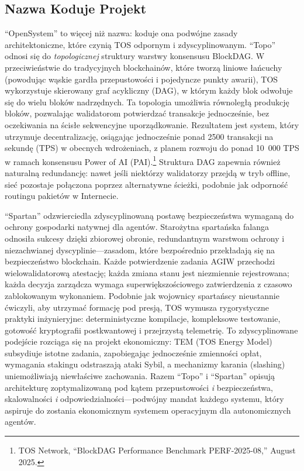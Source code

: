 \documentclass[11pt]{article}
\begin{document}
\subsection{Nazwa Koduje Projekt}
``OpenSystem'' to więcej niż nazwa: koduje ona podwójne zasady architektoniczne, które czynią TOS odpornym i zdyscyplinowanym. ``Topo'' odnosi się do \emph{topologicznej} struktury warstwy konsensusu BlockDAG. W przeciwieństwie do tradycyjnych blockchainów, które tworzą liniowe łańcuchy (powodując wąskie gardła przepustowości i pojedyncze punkty awarii), TOS wykorzystuje skierowany graf acykliczny (DAG), w którym każdy blok odwołuje się do wielu bloków nadrzędnych. Ta topologia umożliwia równoległą produkcję bloków, pozwalając walidatorom potwierdzać transakcje jednocześnie, bez oczekiwania na ścisłe sekwencyjne uporządkowanie. Rezultatem jest system, który utrzymuje decentralizację, osiągając jednocześnie ponad 2500 transakcji na sekundę (TPS) w obecnych wdrożeniach, z planem rozwoju do ponad 10~000 TPS w ramach konsensusu Power of AI (PAI).\footnote{TOS Network, ``BlockDAG Performance Benchmark PERF-2025-08,'' August 2025.} Struktura DAG zapewnia również naturalną redundancję: nawet jeśli niektórzy walidatorzy przejdą w tryb offline, sieć pozostaje połączona poprzez alternatywne ścieżki, podobnie jak odporność routingu pakietów w Internecie.

``Spartan'' odzwierciedla zdyscyplinowaną postawę bezpieczeństwa wymaganą do ochrony gospodarki natywnej dla agentów. Starożytna spartańska falanga odnosiła sukcesy dzięki zbiorowej obronie, redundantnym warstwom ochrony i niezachwianej dyscyplinie---zasadom, które bezpośrednio przekładają się na bezpieczeństwo blockchain. Każde potwierdzenie zadania AGIW przechodzi wielowalidatorową atestację; każda zmiana stanu jest niezmiennie rejestrowana; każda decyzja zarządcza wymaga superwięk\-szościowego zatwierdzenia z czasowo zablokowanym wykonaniem. Podobnie jak wojownicy spartańscy nieustannie ćwiczyli, aby utrzymać formację pod presją, TOS wymusza rygorystyczne praktyki inżynieryjne: deterministyczne kompilacje, kompleksowe testowanie, gotowość kryptografii postkwantowej i przejrzystą telemetrię. To zdyscyplinowane podejście rozciąga się na projekt ekonomiczny: TEM (TOS Energy Model) subsydiuje istotne zadania, zapobiegając jednocześnie zmienności opłat, wymagania stakingu odstraszają ataki Sybil, a mechanizmy karania (slashing) uniemożliwiają niewłaściwe zachowania. Razem ``Topo'' i ``Spartan'' opisują architekturę zoptymalizowaną pod kątem przepustowości \emph{i} bezpieczeństwa, skalowalności \emph{i} odpowiedzialności---podwójny mandat każdego systemu, który aspiruje do zostania ekonomicznym systemem operacyjnym dla autonomicznych agentów.
\end{document}
